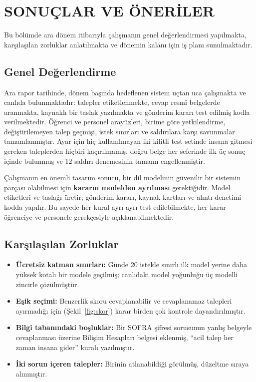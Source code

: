 \chapter{SONUÇLAR VE ÖNERİLER}
\label{ch:sonuc}

Bu bölümde ara dönem itibarıyla çalışmanın genel değerlendirmesi yapılmakta, karşılaşılan zorluklar
anlatılmakta ve dönemin kalanı için iş planı sunulmaktadır.

\section{Genel Değerlendirme}

Ara rapor tarihinde, dönem başında hedeflenen sistem uçtan uca çalışmakta ve canlıda
bulunmaktadır: talepler etiketlenmekte, cevap resmî belgelerde aranmakta, kaynaklı bir taslak
yazılmakta ve gönderim kararı test edilmiş kodla verilmektedir. Öğrenci ve personel arayüzleri,
birime göre yetkilendirme, değiştirilemeyen talep geçmişi, istek sınırları ve saldırılara karşı
savunmalar tamamlanmıştır. Ayar için hiç kullanılmayan iki kilitli test setinde insana gitmesi
gereken taleplerden hiçbiri kaçırılmamış, doğru belge her seferinde ilk üç sonuç içinde bulunmuş ve
12 saldırı denemesinin tamamı engellenmiştir.

Çalışmanın en önemli tasarım sonucu, bir dil modelinin güvenilir bir sistemin parçası olabilmesi için
\textbf{kararın modelden ayrılması} gerektiğidir. Model etiketleri ve taslağı üretir; gönderim kararı,
kaynak kartları ve alıntı denetimi kodda yapılır. Bu sayede her kural ayrı ayrı test edilebilmekte,
her karar öğrenciye ve personele gerekçesiyle açıklanabilmektedir.

\section{Karşılaşılan Zorluklar}

\begin{itemize}
  \item \textbf{Ücretsiz katman sınırları:} Günde 20 istekle sınırlı ilk model yerine daha yüksek
        kotalı bir modele geçilmiş; canlıdaki model yoğunluğu üç modelli zincirle çözülmüştür.
  \item \textbf{Eşik seçimi:} Benzerlik skoru cevaplanabilir ve cevaplanamaz talepleri ayırmadığı için
        (Şekil~\ref{fig:skor}) karar birden çok kontrole dayandırılmıştır.
  \item \textbf{Bilgi tabanındaki boşluklar:} Bir SOFRA şifresi sorusunun yanlış belgeyle
        cevaplanması üzerine Bilişim Hesapları belgesi eklenmiş, ``acil talep her zaman insana gider''
        kuralı yazılmıştır.
  \item \textbf{İki sorun içeren talepler:} Birinin atlanabildiği görülmüş, düzeltme sıraya alınmıştır.
\end{itemize}


